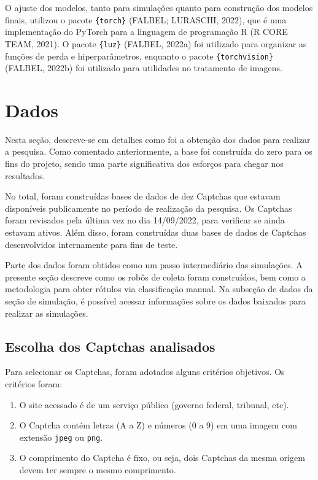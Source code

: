 \documentclass[12pt,twoside,brazilian]{book}
\providecommand{\tightlist}{%
  \setlength{\itemsep}{0pt}\setlength{\parskip}{0pt}}
\begin{document}
O ajuste dos modelos, tanto para simulações quanto para construção dos
modelos finais, utilizou o pacote \texttt{\{torch\}} (FALBEL; LURASCHI,
2022), que é uma implementação do PyTorch para a linguagem de
programação R (R CORE TEAM, 2021). O pacote \texttt{\{luz\}} (FALBEL,
2022a) foi utilizado para organizar as funções de perda e
hiperparâmetros, enquanto o pacote \texttt{\{torchvision\}} (FALBEL,
2022b) foi utilizado para utilidades no tratamento de imagens.

\hypertarget{dados}{%
\section{Dados}\label{dados}}

Nesta seção, descreve-se em detalhes como foi a obtenção dos dados para
realizar a pesquisa. Como comentado anteriormente, a base foi construída
do zero para os fins do projeto, sendo uma parte significativa dos
esforços para chegar nos resultados.

No total, foram construídas bases de dados de dez Captchas que estavam
disponíveis publicamente no período de realização da pesquisa. Os
Captchas foram revisados pela última vez no dia 14/09/2022, para
verificar se ainda estavam ativos. Além disso, foram construídas duas
bases de dados de Captchas desenvolvidos internamente para fins de
teste.

Parte dos dados foram obtidos como um passo intermediário das
simulações. A presente seção descreve como os robôs de coleta foram
construídos, bem como a metodologia para obter rótulos via classificação
manual. Na subseção de dados da seção de simulação, é possível acessar
informações sobre os dados baixados para realizar as simulações.

\hypertarget{escolha-dos-captchas-analisados}{%
\subsection{Escolha dos Captchas
analisados}\label{escolha-dos-captchas-analisados}}

Para selecionar os Captchas, foram adotados alguns critérios objetivos.
Os critérios foram:

\begin{enumerate}
\def\labelenumi{\arabic{enumi}.}
\tightlist
\item
  O site acessado é de um serviço público (governo federal, tribunal,
  etc).
\item
  O Captcha contém letras (A a Z) e números (0 a 9) em uma imagem com
  extensão \texttt{jpeg} ou \texttt{png}.
\item
  O comprimento do Captcha é fixo, ou seja, dois Captchas da mesma
  origem devem ter sempre o mesmo comprimento.
\end{enumerate}
\end{document}
